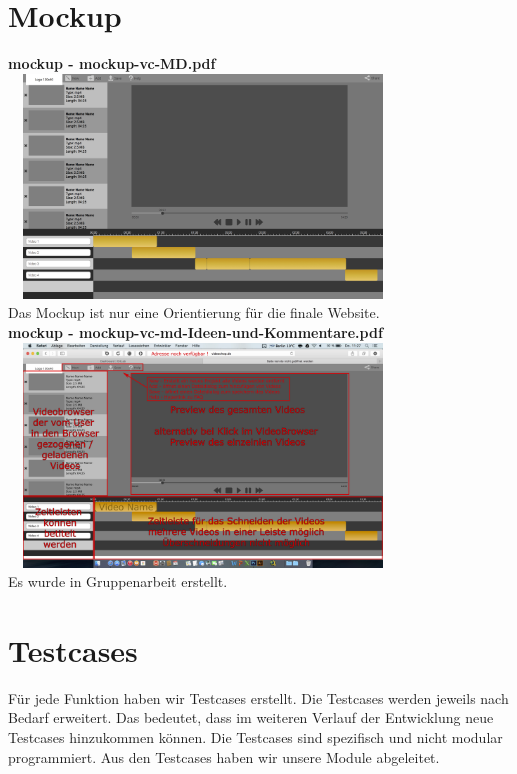 \documentclass[a4paper,10pt]{scrartcl}
\begin{document}
\section{Mockup}
\textbf{mockup - mockup-vc-MD.pdf} \\
\includegraphics[height=225px, width=390px]{images/mockup.png}\\
\vspace*{1mm}
Das Mockup ist nur eine Orientierung für die finale Website.\\ 
\textbf{mockup - mockup-vc-md-Ideen-und-Kommentare.pdf} \\
\includegraphics[height=225px, width=390px]{images/mockup2.png}\\
Es wurde in Gruppenarbeit erstellt.
\newpage
\section{Testcases}
Für jede Funktion haben wir Testcases erstellt. Die Testcases werden jeweils nach Bedarf erweitert. Das bedeutet, dass im weiteren Verlauf der Entwicklung neue Testcases hinzukommen können. Die Testcases sind spezifisch und nicht modular programmiert. Aus den Testcases haben wir unsere Module abgeleitet.
\end{document}

